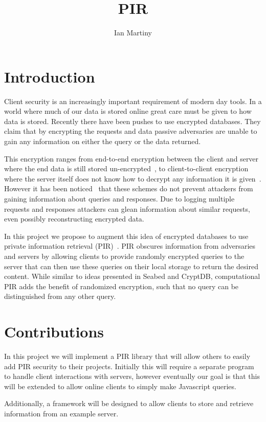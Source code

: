 \documentclass{article}
\title{PIR}
\author{Ian Martiny}
\date{}
\begin{document}
\maketitle

\section{Introduction}
Client security is an increasingly important requirement of modern day tools.
In a world where much of our data is stored online great care must be given to
how data is stored. Recently there have been pushes to use encrypted databases.
They claim that by encrypting the requests and data passive adversaries are
unable to gain any information on either the query or the data returned. 

This encryption ranges from end-to-end encryption between the client and server
where the end data is still stored un-encrypted~\cite{mylar, arx}, to
client-to-client encryption where the server itself does not know how to decrypt
any information it is given~\cite{seabed,cryptdb}. However it has been 
noticed~\cite{morningPaper} that these schemes do not prevent attackers from
gaining information about queries and responses. Due to logging multiple
requests and responses attackers can glean information about similar requests,
even possibly reconstructing encrypted data.

In this project we propose to augment this idea of encrypted databases to use
private information retrieval (PIR)~\cite{PIR,CPIR}. PIR obscures information
from adversaries and servers by allowing clients to provide randomly encrypted
queries to the server that can then use these queries on their local storage to
return the desired content. While similar to ideas presented in Seabed and
CryptDB, computational PIR adds the benefit of randomized encryption, such that
no query can be distinguished from any other query.

\section{Contributions}
In this project we will implement a PIR library that will allow others to easily
add PIR security to their projects. Initially this will require a separate
program to handle client interactions with servers, however eventually our goal
is that this will be extended to allow online clients to simply make Javascript
queries. 

Additionally, a framework will be designed to allow clients to store and
retrieve information from an example server.



\end{document}
